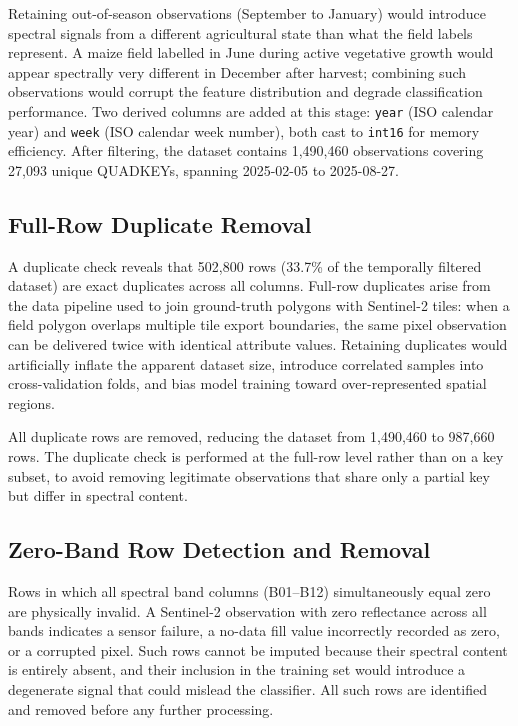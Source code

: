 Retaining out-of-season observations (September to January) would
introduce spectral signals from a different agricultural state than what
the field labels represent. A maize field labelled in June during active
vegetative growth would appear spectrally very different in December after
harvest; combining such observations would corrupt the feature distribution
and degrade classification performance. Two derived columns are added at
this stage: \texttt{year} (ISO calendar year) and \texttt{week} (ISO
calendar week number), both cast to \texttt{int16} for memory efficiency.
After filtering, the dataset contains 1,490,460 observations covering
27,093 unique QUADKEYs, spanning 2025-02-05 to 2025-08-27.


\subsection{Full-Row Duplicate Removal}
\label{subsec:dedup_full}

A duplicate check reveals that 502,800 rows (33.7\% of the temporally
filtered dataset) are exact duplicates across all columns. Full-row
duplicates arise from the data pipeline used to join ground-truth polygons
with Sentinel-2 tiles: when a field polygon overlaps multiple tile export
boundaries, the same pixel observation can be delivered twice with
identical attribute values. Retaining duplicates would artificially
inflate the apparent dataset size, introduce correlated samples into
cross-validation folds, and bias model training toward over-represented
spatial regions.

All duplicate rows are removed, reducing the dataset from 1,490,460 to
987,660 rows. The duplicate check is performed at the full-row level
rather than on a key subset, to avoid removing legitimate observations
that share only a partial key but differ in spectral content.


\subsection{Zero-Band Row Detection and Removal}
\label{subsec:zero_band}

Rows in which all spectral band columns (B01--B12) simultaneously equal
zero are physically invalid. A Sentinel-2 observation with zero
reflectance across all bands indicates a sensor failure, a no-data fill
value incorrectly recorded as zero, or a corrupted pixel. Such rows
cannot be imputed because their spectral content is entirely absent, and
their inclusion in the training set would introduce a degenerate signal
that could mislead the classifier. All such rows are identified and
removed before any further processing.


